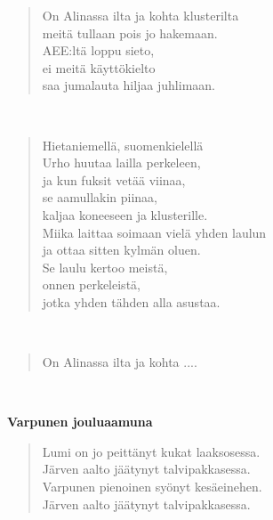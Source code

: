 \noindent\begin{minipage}{\linewidth}
\begin{verse}
	On Alinassa ilta ja kohta klusterilta\\
	meitä tullaan pois jo hakemaan.\\
	AEE:ltä loppu sieto,\\
	ei meitä käyttökielto\\
	saa jumalauta hiljaa juhlimaan.\\
\end{verse}
\end{minipage}\\[10pt]
\noindent\begin{minipage}{\linewidth}
\begin{verse}
	Hietaniemellä, suomenkielellä\\
	Urho huutaa lailla perkeleen,\\
	ja kun fuksit vetää viinaa,\\
	se aamullakin piinaa,\\
	kaljaa koneeseen ja klusterille.\\
	Miika laittaa soimaan vielä yhden laulun\\
	ja ottaa sitten kylmän oluen.\\
	Se laulu kertoo meistä,\\
	onnen perkeleistä,\\
	jotka yhden tähden alla asustaa.\\
\end{verse}
\end{minipage}\\[10pt]
\noindent\begin{minipage}{\linewidth}
\begin{verse}
	On Alinassa ilta ja kohta ....\\
\end{verse}
\end{minipage}\\[10pt]
%
%
\noindent\begin{minipage}{\linewidth}
\vspace{5pt}
\parbox[t]{0.85\linewidth}{\raggedright {\large\bf Varpunen jouluaamuna}\\[6pt]}
\begin{verse}
	Lumi on jo peittänyt kukat laaksosessa.\\
	Järven aalto jäätynyt talvipakkasessa.\\
	Varpunen pienoinen syönyt kesäeinehen.\\
	Järven aalto jäätynyt talvipakkasessa.\\
\end{verse}
\end{minipage}\\[10pt]
